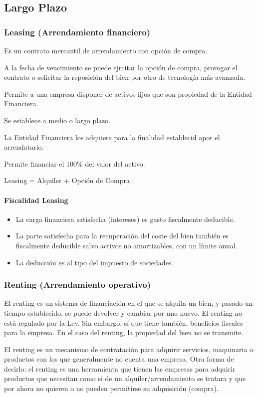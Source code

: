 \subsection{Largo Plazo}
\subsubsection{Leasing (Arrendamiento financiero)}
Es un contrato mercantil de arrendamiento con opción de compra.

A la fecha de vencimiento se puede ejrcitar la opción de compra, prorogar el contrato o solicitar la reposición del bien por otro de tecnología más avanzada.

Permite a una empresa disponer de activos fijos que son propiedad de la Entidad Financiera.

Se establece a medio o largo plazo.

La Entidad Financiera los adquiere para la finalidad establecid apor el arrendatario.

Permite financiar el 100\% del valor del activo.

Leasing = Alquiler + Opción de Compra

\paragraph{Fiscalidad Leasing}
\begin{itemize}
    \item La carga financiera satisfecha (intereses) es gasto fiscalmente deducible.
    \item La parte satisfecha para la recuperación del coste del bien también es fiscalmente deducible salvo activos no amortizables, con un límite anual.
    \item La deducción es al tipo del impuesto de sociedades.
\end{itemize}

\subsubsection{Renting (Arrendamiento operativo)}
El renting es un sistema de financiación en el que se alquila un bien, y pasado un tiempo establecido, se puede devolver y cambiar por uno nuevo. El renting no está regulado por la Ley. Sin embargo, sí que tiene también, beneficios fiscales para la empresa. En el caso del renting, la propiedad del bien no se transmite.

El renting es un mecanismo de contratación para adquirir servicios, maquinaria o productos con los que generalmente no cuenta una empresa. Otra forma de decirlo: el renting es una herramienta que tienen las empresas para adquirir productos que necesitan como si de un alquiler/arrendamiento se tratara y que por ahora no quieren o no pueden permitirse su adquisición (compra).

